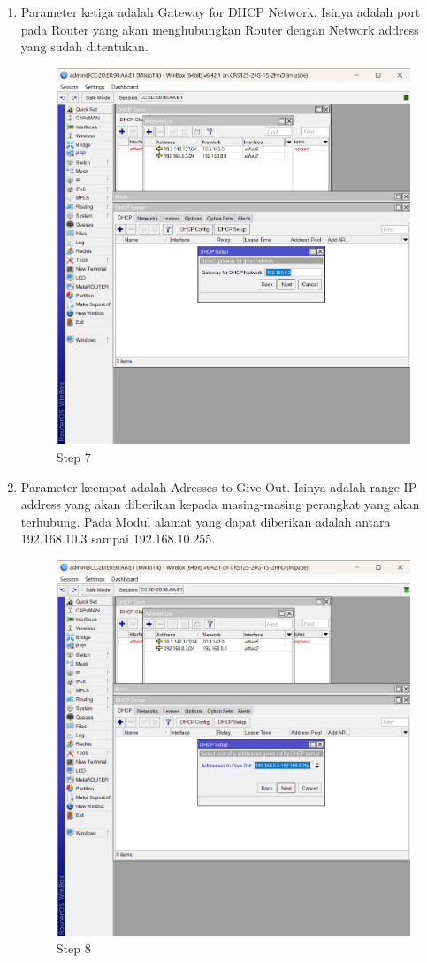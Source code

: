 \begin{enumerate}
	\item Parameter ketiga adalah Gateway for DHCP Network. Isinya adalah port pada Router yang
	akan menghubungkan Router dengan Network address yang sudah ditentukan.
	\begin{figure}[H]
		\centering
		\includegraphics[width=0.5\linewidth]{P3/img/step7.jpg}
		\caption{Step 7}
		\label{fig:gambar4}
	\end{figure}

	\item Parameter keempat adalah Adresses to Give Out. Isinya adalah range IP address yang akan
	diberikan kepada masing-masing perangkat yang akan terhubung. Pada Modul alamat yang
	dapat diberikan adalah antara 192.168.10.3 sampai 192.168.10.255.
	\begin{figure}[H]
		\centering
		\includegraphics[width=0.5\linewidth]{P3/img/step8.jpg}
		\caption{Step 8}
		\label{fig:gambar4}
	\end{figure}


\end{enumerate}
